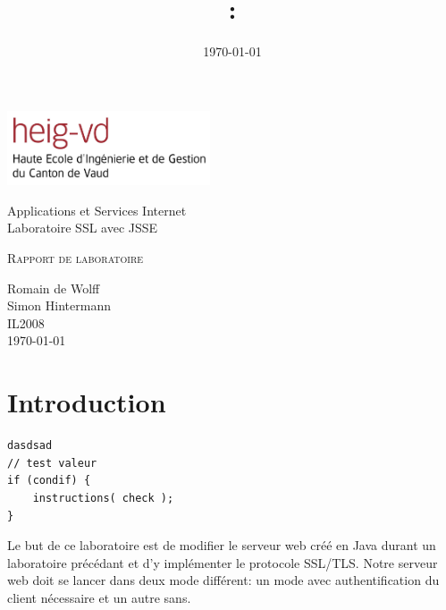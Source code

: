 \documentclass[10pt,a4paper,titlepage]{article}
\author{\auteurOne}
\title{\branchetag : \laboname}
\date{\today}
\newcommand{\branche}{Applications et Services Internet}
\newcommand{\laboname}{Laboratoire SSL avec JSSE}
\newcommand{\auteurOne}{Romain de Wolff \\ Simon Hintermann}
\newcommand{\promo}{IL2008}
\newcommand{\titreDocument}{Rapport de laboratoire}
\begin{document}
\pagestyle{headings}
\begin{titlepage}
	\begin{center}

		\includegraphics[width=6cm]{img/HEIG-VD.jpg}

		\vspace{3cm}
		\LARGE \branche %
		\vspace{3cm}\\
		\Huge \laboname \\
		\vspace{3cm}

		\Large \textsc{\titreDocument} \\
		\vspace{3cm}

		\large \auteurOne \\
		\vspace{10pt}
		\normalsize \textsc{\promo} \\
		\vspace{1cm}
		\today
	\end{center}
\end{titlepage}

\tableofcontents
\newpage
\pagestyle{fancy}
 
\section{Introduction}

\begin{lstlisting}
dasdsad
// test valeur
if (condif) {
	instructions( check );
}
\end{lstlisting}
Le but de ce laboratoire est de modifier le serveur web créé en Java durant un laboratoire précédant et d'y implémenter le protocole SSL/TLS. Notre serveur web doit se lancer dans deux mode différent: un mode avec authentification du client nécessaire et un autre sans. 
\end{document}
